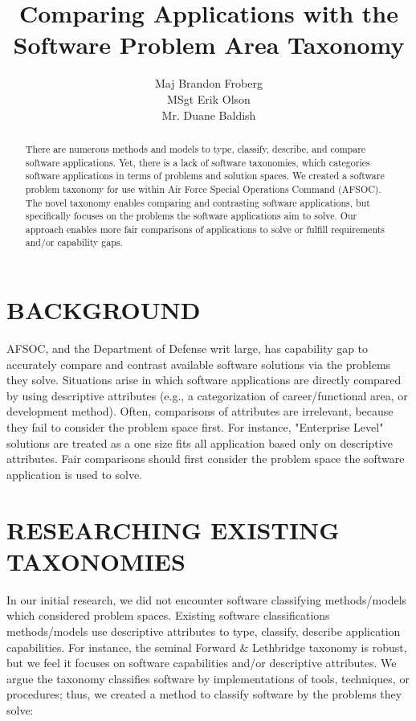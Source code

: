 \documentclass[letterpaper, 10 pt, conference]{ieeeconf}
\title{\LARGE \bf
Comparing Applications with the Software Problem Area Taxonomy
}
\author{
  \parbox{2.0 in}{\centering Maj Brandon Froberg}
  \hspace{ 0.15 in}
  \parbox{2.0 in}{ \centering MSgt Erik Olson}
  \hspace{ 0.15 in}
  \parbox{2.0 in}{ \centering Mr. Duane Baldish}
}
\begin{document}
\maketitle
\thispagestyle{empty}
\pagestyle{empty}


\begin{abstract}

There are numerous methods and models to type, classify, describe, and compare software applications.
Yet, there is a lack of software taxonomies, which categories software applications in terms of problems and solution spaces.
We created a software problem taxonomy for use within Air Force Special Operations Command (AFSOC).
The novel taxonomy enables comparing and contrasting software applications, but specifically focuses on the problems the software applications aim to solve.
Our approach enables more fair comparisons of applications to solve or fulfill requirements and/or capability gaps.
  
\end{abstract}


\section{BACKGROUND}
%
%
AFSOC, and the Department of Defense writ large, has capability gap to accurately compare and contrast available software solutions via the problems they solve.
Situations arise in which software applications are directly compared by using descriptive attributes (e.g., a categorization of career/functional area, or development method).
Often, comparisons of attributes are irrelevant, because they fail to consider the problem space first.
For instance, "Enterprise Level" solutions are treated as a one size fits all application based only on descriptive attributes.
Fair comparisons should first consider the problem space the software application is used to solve.


\section{RESEARCHING EXISTING TAXONOMIES}
%
%
In our initial research, we did not encounter software classifying methods/models which considered problem spaces.
Existing software classifications methods/models use descriptive attributes to type, classify, describe application capabilities.
For instance, the seminal Forward \& Lethbridge taxonomy is robust, but we feel it focuses on software capabilities and/or descriptive attributes\cite{forward2008taxonomy}.
We argue the taxonomy classifies software by implementations of tools, techniques, or procedures; thus, we created a method to classify software by the problems they solve:
\end{document}
